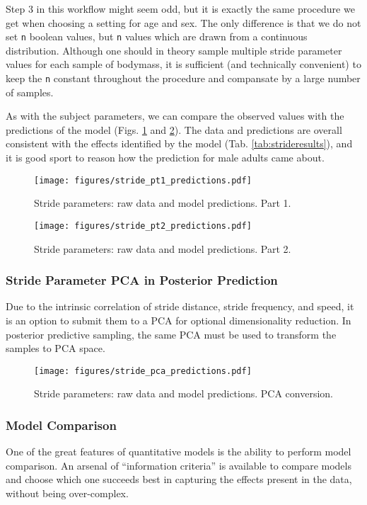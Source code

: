 Step 3 in this workflow might seem odd, but it is exactly the same procedure we get when choosing a setting for age and sex.
The only difference is that we do not set \texttt{n} boolean values, but \texttt{n} values which are drawn from a continuous distribution.
Although one should in theory sample multiple stride parameter values for each sample of bodymass, it is sufficient (and technically convenient) to keep the \texttt{n} constant throughout the procedure and compansate by a large number of samples.


As with the subject parameters, we can compare the observed values with the predictions of the model (Figs. \ref{fig:stride1} and \ref{fig:stride2}).
The data and predictions are overall consistent with the effects identified by the model (Tab. \ref{tab:strideresults}), and it is good sport to reason how the prediction for male adults came about.


\begin{figure}[htbp]
\centering
\texttt{[image: figures/stride\_pt1\_predictions.pdf]}
\caption{\label{fig:stride1}Stride parameters: raw data and model predictions. Part 1.}
\end{figure}

\begin{figure}[htbp]
\centering
\texttt{[image: figures/stride\_pt2\_predictions.pdf]}
\caption{\label{fig:stride2}Stride parameters: raw data and model predictions. Part 2.}
\end{figure}



\subsubsection{Stride Parameter PCA in Posterior Prediction}
\label{sec:org82b0840}
Due to the intrinsic correlation of stride distance, stride frequency, and speed, it is an option to submit them to a PCA for optional dimensionality reduction.
In posterior predictive sampling, the same PCA must be used to transform the samples to PCA space.

\begin{figure}[htbp]
\centering
\texttt{[image: figures/stride\_pca\_predictions.pdf]}
\caption{\label{fig:stridepca}Stride parameters: raw data and model predictions. PCA conversion.}
\end{figure}



\subsubsection{Model Comparison}
\label{strides:comparison}
One of the great features of quantitative models is the ability to perform model comparison.
An arsenal of ``information criteria'' is available to compare models and choose which one succeeds best in capturing the effects present in the data, without being over-complex.

